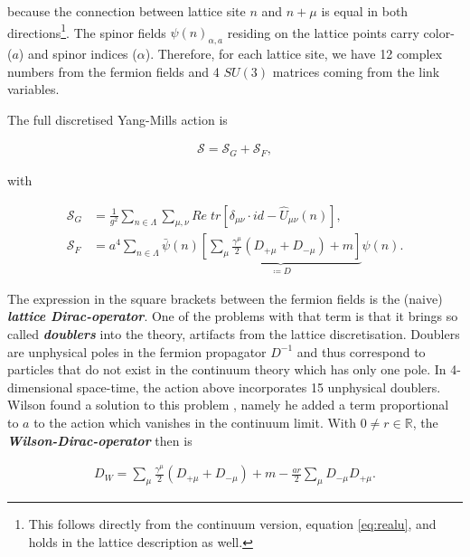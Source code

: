 \documentclass{article}
\theoremstyle{plain} %
\theoremstyle{convention} %
\theoremstyle{remark} %
\def\df#1{\textbf{\textit{#1}}}
\numberwithin{equation}{section}
\begin{document}
because the connection between lattice site $n$ and $n + \mu$ is equal in both directions\footnote{This follows directly from the continuum version, equation \eqref{eq:realu}, and holds in the lattice description as well.}. The spinor fields $\psi(n)_{\alpha,a}$ residing on the lattice points carry color- ($a$) and spinor indices ($\alpha$). Therefore, for each lattice site, we have \num{12} complex numbers from the fermion fields and \num{4} $SU(3)$ matrices coming from the link variables.

The full discretised Yang-Mills action is

\begin{align*}
    \mathcal{S} = \mathcal{S}_G + \mathcal{S}_F,
\end{align*}

with

\begin{align*}
    \mathcal{S}_G &= \frac{1}{g^2} \sum_{n \in \Lambda} \sum_{\mu, \nu} Re \; tr\left[ \delta_{\mu \nu} \cdot id - \hat{U}_{\mu \nu}(n) \right], \\
    \mathcal{S}_F &= a^4 \sum_{n \in \Lambda} \bar{\psi}(n) \underbrace{\left[ \sum_{\mu} \frac{\gamma^{\mu}}{2} (D_{+\mu} + D_{-\mu}) + m \right]}_{\coloneqq D} \psi(n).
\end{align*}

The expression in the square brackets between the fermion fields is the (naive) \df{lattice Dirac-operator}. One of the problems with that term is that it brings so called \df{doublers} into the theory, artifacts from the lattice discretisation. Doublers are unphysical poles in the fermion propagator $D^{-1}$ and thus correspond to particles that do not exist in the continuum theory which has only one pole. In 4-dimensional space-time, the action above incorporates \num{15} unphysical doublers\footnotemark. Wilson found a solution to this problem \cite{wilson1974}, namely he added a term proportional to $a$ to the action which vanishes in the continuum limit. With $0 \ne r \in \mathbb{R}$, the \df{Wilson-Dirac-operator} then is


\begin{align}
    D_W = \sum_{\mu} \frac{\gamma^{\mu}}{2} (D_{+\mu} + D_{-\mu}) + m - \frac{a r}{2} \sum_{\mu} D_{-\mu} D_{+\mu}. \label{eq:dwop}
\end{align}
\end{document}

